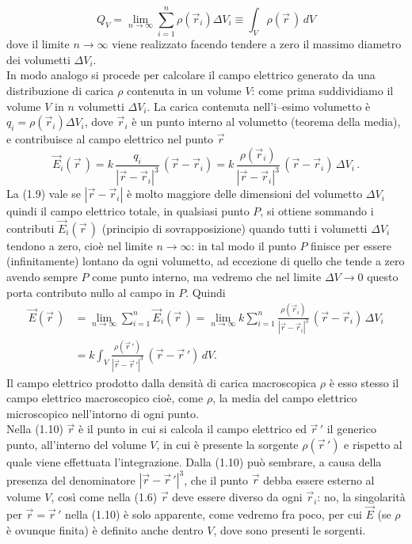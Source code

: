 \begin{equation}
Q_V=\lim_{n\to\infty}\sum_{i=1}^n\rho(\vec r_i)\Delta V_i\equiv\int_V\rho(\vec r\,)\,dV
\tag{1.8}
\end{equation}
dove il limite $n\to\infty$ viene realizzato facendo tendere a zero il massimo diametro dei volumetti $\Delta V_i$.\\
In modo analogo si procede per calcolare il campo elettrico generato da una distribuzione di carica $\rho$ contenuta in un volume $V$: come prima suddividiamo il volume $V$ in $n$ volumetti $\Delta V_i$. La carica contenuta nell'i--esimo volumetto è $q_i=\rho(\vec r_i)\Delta V_i$, dove $\vec r_i$ è un punto interno al volumetto (teorema della media), e contribuisce al campo elettrico nel punto $\vec r$
\begin{equation}
\vec E_i(\vec r\,)=k\,\frac{q_i}{|\vec r-\vec r_i|^3}\,(\vec r-\vec r_i)=k\,\frac{\rho(\vec r_i)}{|\vec r-\vec r_i|^3}\,(\vec r-\vec r_i)\,\Delta V_i\,.
\tag{1.9}
\end{equation}
La (1.9) vale se $|\vec r-\vec r_i|$ è molto maggiore delle dimensioni del volumetto $\Delta V_i$ quindi il campo elettrico totale, in qualsiasi punto $P$, si ottiene sommando i contributi $\vec E_i(\vec r\,)$
(principio di sovrapposizione) quando tutti i volumetti $\Delta V_i$ tendono a zero, cioè nel limite $n\to\infty$: in tal modo il punto $P$ finisce per essere (infinitamente) lontano da ogni volumetto, ad eccezione di quello che tende a zero avendo sempre $P$ come punto interno, ma vedremo che nel limite $\Delta V\to0$ questo porta contributo nullo al campo in $P$. Quindi
\begin{equation}
\begin{split}
\vec E(\vec r\,)&=\lim_{n\to\infty}\sum_{i=1}^n\vec E_i(\vec r\,)=\lim_{n\to\infty}k\sum_{i=1}^n\frac{\rho(\vec r_i)}{|\vec r-\vec r_i|^3}\,(\vec r-\vec r_i)\,\Delta V_i\\
&=k\int_V\frac{\rho(\vec r\,')}{|\vec r-\vec r\,'|^3}\,(\vec r-\vec r\,')\,dV.
\end{split}
\tag{1.10}
\end{equation}
Il campo elettrico prodotto dalla densità di carica macroscopica $\rho$ è esso stesso il campo elettrico macroscopico cioè, come $\rho$, la media del campo elettrico microscopico nell'intorno di ogni punto.\\
Nella (1.10) $\vec r$ è il punto in cui si calcola il campo elettrico ed $\vec r\,'$ il generico punto, all'interno del volume $V$, in cui è presente la sorgente $\rho(\vec r\,')$ e rispetto al quale viene effettuata l'integrazione. Dalla (1.10) può sembrare, a causa della presenza del denominatore $|\vec r-\vec r\,'|^3$, che il punto $\vec r$ debba essere esterno al volume $V$, così come nella (1.6) $\vec r$ deve essere diverso da ogni $\vec r_i$: no, la singolarità per $\vec r=\vec r\,'$ nella (1.10) è solo apparente, come vedremo fra poco, per cui $\vec E$ (se $\rho$ è ovunque finita) è definito anche dentro $V$, dove sono presenti le sorgenti.\\
